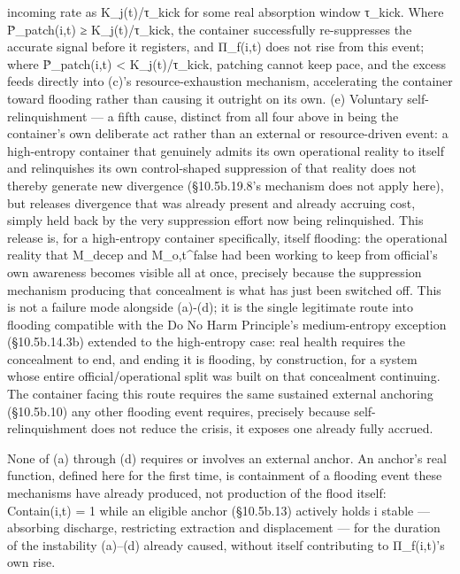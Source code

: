 \documentclass[
]{article}
\begin{document}
incoming rate as K\_j(t)/τ\_kick for some real absorption window
τ\_kick. Where Ṗ\_patch(i,t) ≥ K\_j(t)/τ\_kick, the container
successfully re-suppresses the accurate signal before it registers, and
Π\_f(i,t) does not rise from this event; where Ṗ\_patch(i,t) \textless{}
K\_j(t)/τ\_kick, patching cannot keep pace, and the excess feeds
directly into (c)'s resource-exhaustion mechanism, accelerating the
container toward flooding rather than causing it outright on its own.
(e) Voluntary self-relinquishment --- a fifth cause, distinct from all
four above in being the container's own deliberate act rather than an
external or resource-driven event: a high-entropy container that
genuinely admits its own operational reality to itself and relinquishes
its own control-shaped suppression of that reality does not thereby
generate new divergence (§10.5b.19.8's mechanism does not apply here),
but releases divergence that was already present and already accruing
cost, simply held back by the very suppression effort now being
relinquished. This release is, for a high-entropy container
specifically, itself flooding: the operational reality that M\_decep and
M\_o,t\^{}false had been working to keep from official's own awareness
becomes visible all at once, precisely because the suppression mechanism
producing that concealment is what has just been switched off. This is
not a failure mode alongside (a)-(d); it is the single legitimate route
into flooding compatible with the Do No Harm Principle's medium-entropy
exception (§10.5b.14.3b) extended to the high-entropy case: real health
requires the concealment to end, and ending it is flooding, by
construction, for a system whose entire official/operational split was
built on that concealment continuing. The container facing this route
requires the same sustained external anchoring (§10.5b.10) any other
flooding event requires, precisely because self-relinquishment does not
reduce the crisis, it exposes one already fully accrued.

None of (a) through (d) requires or involves an external anchor. An
anchor's real function, defined here for the first time, is containment
of a flooding event these mechanisms have already produced, not
production of the flood itself: Contain(i,t) = 1 while an eligible
anchor (§10.5b.13) actively holds i stable --- absorbing discharge,
restricting extraction and displacement --- for the duration of the
instability (a)--(d) already caused, without itself contributing to
Π\_f(i,t)'s own rise.
\end{document}
